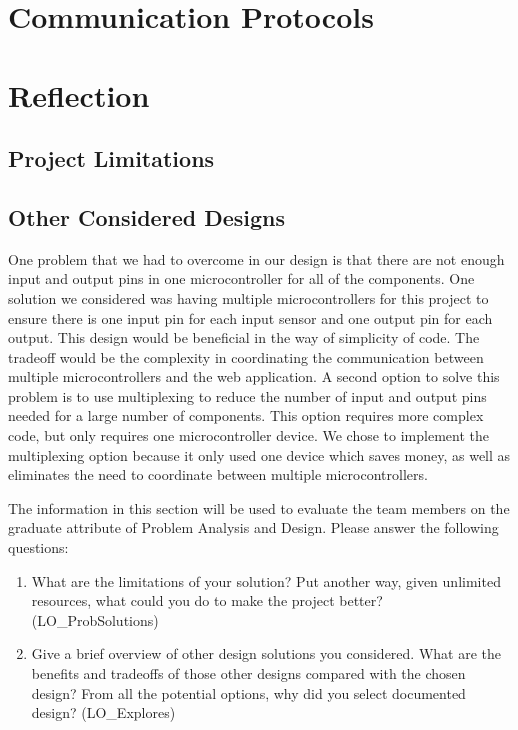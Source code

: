 \documentclass[12pt, titlepage]{article}
\begin{document}
\section{Communication Protocols}

\section{Reflection}

\subsection*{Project Limitations}

\subsection*{Other Considered Designs}
One problem that we had to overcome in our design is that there are not enough input and output pins in one microcontroller for all of the components.
One solution we considered was having multiple microcontrollers for this project to ensure there is one input pin for each input sensor and one output pin for each output.
This design would be beneficial in the way of simplicity of code. The tradeoff would be the complexity in coordinating the communication between multiple microcontrollers and the 
web application. A second option to solve this problem is to use multiplexing to reduce the number of input and output pins needed for a large number of components. 
This option requires more complex code, but only requires one microcontroller device. We chose to implement the multiplexing option because it only used one device which saves money,
as well as eliminates the need to coordinate between multiple microcontrollers. 

The information in this section will be used to evaluate the team members on the
graduate attribute of Problem Analysis and Design.  Please answer the following questions:

\begin{enumerate}
  \item What are the limitations of your solution?  Put another way, given
  unlimited resources, what could you do to make the project better? (LO\_ProbSolutions)
  \item Give a brief overview of other design solutions you considered.  What
  are the benefits and tradeoffs of those other designs compared with the chosen
  design?  From all the potential options, why did you select documented design?
  (LO\_Explores)
\end{enumerate}
\end{document}
